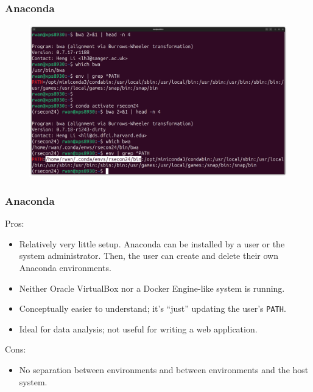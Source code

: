 \documentclass[11pt,aspectratio=43,ignorenonframetext,t]{beamer}
\begin{document}
\begin{frame}

\frametitle{Anaconda}

\begin{figure}
  \centering
  \includegraphics[width=\textwidth]{screencaps/anaconda-highlight}
\end{figure}

\end{frame}


\begin{frame}

\frametitle{Anaconda}

Pros:
\begin{itemize}
  \item Relatively very little setup.  Anaconda can be installed by a user or the system administrator.  Then, the user can create and delete their own Anaconda environments.
  \item Neither Oracle VirtualBox nor a Docker Engine-like system is running.
  \item Conceptually easier to understand; it's ``just'' updating the user's {\texttt{PATH}}.
  \item Ideal for data analysis; not useful for writing a web application.
\end{itemize}

Cons:
\begin{itemize}
  \item No separation between environments and between environments and the host system.
\end{itemize}

\end{frame}
\end{document}
